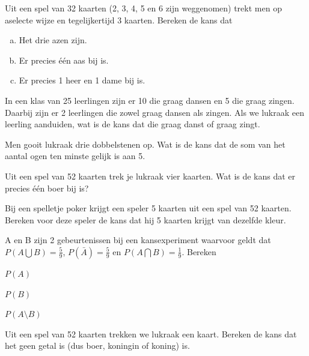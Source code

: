 \documentclass[12pt,twoside]{article}
\begin{document}
\begin{oefening}
Uit een spel van 32 kaarten (2, 3, 4, 5 en 6 zijn weggenomen) trekt men op aselecte wijze en tegelijkertijd 3 kaarten. Bereken de kans dat
\begin{enumerate}[(a)]
  \item Het drie azen zijn.
  \item Er precies één aas bij is.
  \item Er precies 1 heer en 1 dame bij is.
\end{enumerate}
\end{oefening}

\begin{oefening}
In een klas van 25 leerlingen zijn er 10 die graag dansen en 5 die graag
zingen. Daarbij zijn er 2 leerlingen die zowel graag dansen als zingen. Als we lukraak een
leerling aanduiden, wat is de kans dat die graag danst of graag zingt.
\end{oefening}

\begin{oefening}
Men gooit lukraak drie dobbelstenen op. Wat is de kans dat de som van
het aantal ogen ten minste gelijk is aan 5.
\end{oefening}

\begin{oefening}
Uit een spel van 52 kaarten trek je lukraak vier kaarten. Wat is de kans
dat er precies één boer bij is?
\end{oefening}

\begin{oefening}
Bij een spelletje poker krijgt een speler 5 kaarten uit een spel van 52
kaarten. Bereken voor deze speler de kans dat hij 5 kaarten krijgt van dezelfde kleur.
\end{oefening}

\begin{oefening}
A en B zijn 2 gebeurtenissen bij een kansexperiment waarvoor geldt dat $P(A\bigcup B)=\frac{5}{9}$, $P(\bar{A})=\frac{5}{9}$ en $P(A\bigcap B)=\frac{1}{9}$. Bereken
\begin{exlist}{3}
  \item $P(A)$
  \item $P(B)$
  \item $P(A\setminus B)$
\end{exlist}
\end{oefening}

\begin{oefening}
Uit een spel van 52 kaarten trekken we lukraak een kaart. Bereken de kans dat het geen getal is (dus boer, koningin of koning)  is.
\end{oefening}
\end{document}
